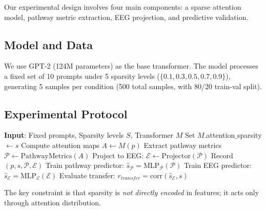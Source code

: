Our experimental design involves four main components: a sparse attention model, pathway metric extraction, EEG projection, and predictive validation.

\subsection*{Model and Data}

We use GPT-2 (124M parameters) as the base transformer. The model processes a fixed set of 10 prompts under 5 sparsity levels ($\{0.1, 0.3, 0.5, 0.7, 0.9\}$), generating 5 samples per condition (500 total samples, with 80/20 train-val split).

\subsection*{Experimental Protocol}

\begin{algorithm}
\caption{Causal EEG Hypothesis Testing Protocol}
\begin{algorithmic}[1]
\State \textbf{Input}: Fixed prompts, Sparsity levels $S$, Transformer $M$
        \State Set $M$.attention$\_$sparsity $\leftarrow s$
        \State Compute attention maps $A \leftarrow M(p)$
        \State Extract pathway metrics $\mathcal{P} \leftarrow \text{PathwayMetrics}(A)$
        \State Project to EEG: $\mathcal{E} \leftarrow \text{Projector}(\mathcal{P})$
        \State Record $(p, s, \mathcal{P}, \mathcal{E})$
    \EndFor
\EndFor
\State Train pathway predictor: $\hat{s}_{\mathcal{P}} = \text{MLP}_{\mathcal{P}}(\mathcal{P})$
\State Train EEG predictor: $\hat{s}_{\mathcal{E}} = \text{MLP}_{\mathcal{E}}(\mathcal{E})$
\State Evaluate transfer: $r_{transfer} = \text{corr}(\hat{s}_{\mathcal{E}}, s)$
\end{algorithmic}
\end{algorithm}

The key constraint is that sparsity is \textit{not directly encoded} in features; it acts only through attention distribution.
